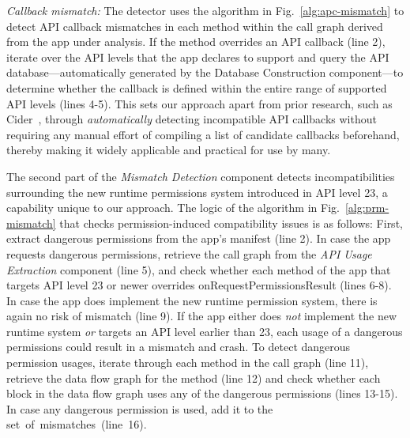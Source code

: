 \textit{Callback mismatch:} %
The detector uses the algorithm in Fig.~\ref{alg:apc-mismatch} to detect API callback mismatches in each method within the call graph derived from the app under analysis.
If the method overrides an API callback
(line 2), iterate over the API levels that the app declares to support and query
the API database---automatically generated by the Database Construction
component---to determine whether the callback is defined within the entire range
of supported API levels (lines 4-5). This sets our approach apart from prior
research, such as {\sc Cider}~\cite{wu2017measuring}, through
\emph{automatically} detecting incompatible API callbacks without requiring any
manual effort of compiling a list of candidate callbacks beforehand, thereby
making it widely applicable and practical for use by many.





The second part of the \textit{Mismatch Detection} component detects
incompatibilities surrounding the new runtime permissions system introduced in
API level 23, a capability unique to our approach. %
The logic of the algorithm in Fig.~\ref{alg:prm-mismatch} that checks permission-induced compatibility issues is as follows:
First, extract dangerous permissions from the app's manifest (line 2).  
In case the app
requests dangerous permissions, retrieve the call graph from the \textit{API Usage
Extraction} component (line 5), and check whether each method of the app that
targets API level 23 or newer overrides {\sf onRequestPermissionsResult} (lines
6-8). In case the app does implement the new runtime permission system, there
is again no risk of mismatch (line 9).  If the app either does \emph{not} implement
the new runtime system \emph{or} targets an API level earlier than
23, each usage of a dangerous permissions could result in a mismatch and crash.
To detect dangerous permission usages, iterate through each method in the call
graph (line 11), retrieve the data flow graph for the method (line 12) and check
whether each block in the data flow graph uses any of the dangerous permissions
(lines 13-15). In case any dangerous permission is used, add it to the
set~of~mismatches~(line~16).





